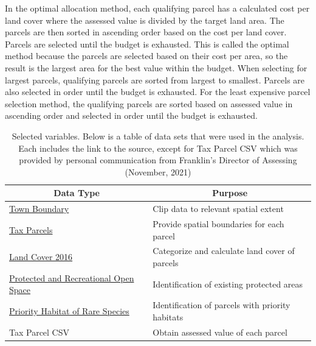 \documentclass[12pt, stu, floatsintext,table]{apa7}
\begin{document}
In the optimal allocation method, each qualifying parcel has a calculated cost per land cover where the assessed value is divided by the target land area. The parcels are then sorted in ascending order based on the cost per land cover. Parcels are selected until the budget is exhausted. This is called the optimal method because the parcels are selected based on their cost per area, so the result is the largest area for the best value within the budget. When selecting for largest parcels, qualifying parcels are sorted from largest to smallest. Parcels are also selected in order until the budget is exhausted. For the least expensive parcel selection method, the qualifying parcels are sorted based on assessed value in ascending order and selected in order until the budget is exhausted. 
\begin{table}[htbp]
\centering
\caption{Selected variables. Below is a table of data sets that were used in the analysis. Each includes the link to the source, except for Tax Parcel CSV which was provided by personal communication from Franklin's Director of Assessing (November, 2021)}
\begin{tabular}{@{}ll@{}}
\toprule
\multicolumn{1}{c}{Data Type} & \multicolumn{1}{c}{Purpose}             \\ \midrule
\href{https://www.mass.gov/info-details/massgis-data-municipalities}{Town Boundary}                                               & Clip data to relevant spatial extent              \\
\href{https://www.mass.gov/info-details/massgis-data-property-tax-parcels}{Tax Parcels}                                           & Provide spatial boundaries for each parcel        \\
\href{https://www.fisheries.noaa.gov/inport/item/54917}{Land Cover 2016}                                                          & Categorize and calculate land cover of parcels \\
\href{https://www.mass.gov/info-details/massgis-data-protected-and-recreational-openspace}{Protected and Recreational Open Space} & Identification of existing protected areas        \\
\href{https://www.mass.gov/info-details/massgis-data-nhesp-priority-habitats-of-rare-species}{Priority Habitat of Rare Species}   & Identification of parcels with priority habitats  \\
Tax Parcel CSV                                                                                                                    & Obtain assessed value of each parcel              \\ \bottomrule
\end{tabular}
\end{table}
\end{document}
